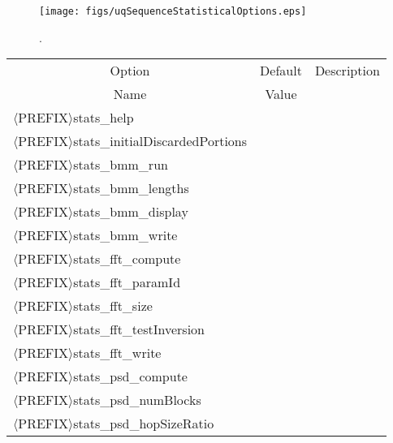 \begin{figure}[h!]
\centerline{
\texttt{[image: figs/uqSequenceStatisticalOptions.eps]}
}
\caption{
{\color{red}{The sequence statistical options class}}.
}
\label{fig-seq-statistical-options-class}
\end{figure}

\begin{table}[!h]
\begin{center}
\begin{tabular}{|l|c|c|}
\hline
\multicolumn{1}{|c|}{Option}                             & Default & Description \\
\multicolumn{1}{|c|}{Name}                               & Value   &             \\
\hline
\hline
$\langle$PREFIX$\rangle$stats\_help                      &         &             \\
\hline
$\langle$PREFIX$\rangle$stats\_initialDiscardedPortions  &         &             \\
\hline
\hline
$\langle$PREFIX$\rangle$stats\_bmm\_run                   &         &             \\
\hline
$\langle$PREFIX$\rangle$stats\_bmm\_lengths               &         &             \\
\hline
$\langle$PREFIX$\rangle$stats\_bmm\_display               &         &             \\
\hline
$\langle$PREFIX$\rangle$stats\_bmm\_write                 &         &             \\
\hline
\hline
$\langle$PREFIX$\rangle$stats\_fft\_compute               &         &             \\
\hline
$\langle$PREFIX$\rangle$stats\_fft\_paramId               &         &             \\
\hline
$\langle$PREFIX$\rangle$stats\_fft\_size                  &         &             \\
\hline
$\langle$PREFIX$\rangle$stats\_fft\_testInversion         &         &             \\
\hline
$\langle$PREFIX$\rangle$stats\_fft\_write                 &         &             \\
\hline
\hline
$\langle$PREFIX$\rangle$stats\_psd\_compute               &         &             \\
\hline
$\langle$PREFIX$\rangle$stats\_psd\_numBlocks             &         &             \\
\hline
$\langle$PREFIX$\rangle$stats\_psd\_hopSizeRatio          &         &             \\

\end{tabular}
\end{center}
\end{table}
